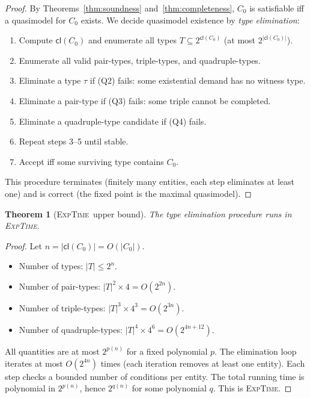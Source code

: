 \documentclass[a4paper,11pt]{article}
\newtheorem{theorem}{Theorem}[section]
\theoremstyle{definition}
\newcommand{\cl}{\ensuremath{\mathsf{cl}}}
\newcommand{\EXPTIME}{\textsc{ExpTime}}
\begin{document}
\begin{proof}
By Theorems~\ref{thm:soundness} and~\ref{thm:completeness},
$C_0$ is satisfiable iff a quasimodel for $C_0$ exists.
We decide quasimodel existence by \emph{type elimination}:

\begin{enumerate}[nosep]
  \item Compute $\cl(C_0)$ and enumerate all types
    $T \subseteq 2^{\cl(C_0)}$ (at most $2^{|\cl(C_0)|}$).
  \item Enumerate all valid pair-types, triple-types, and
    quadruple-types.
  \item Eliminate a type $\tau$ if (Q2) fails: some existential
    demand has no witness type.
  \item Eliminate a pair-type if (Q3) fails: some triple cannot
    be completed.
  \item Eliminate a quadruple-type candidate if (Q4) fails.
  \item Repeat steps 3--5 until stable.
  \item Accept iff some surviving type contains $C_0$.
\end{enumerate}

This procedure terminates (finitely many entities, each
step eliminates at least one) and is correct (the fixed point
is the maximal quasimodel).
\end{proof}


\begin{theorem}[\EXPTIME\ upper bound]
\label{thm:exptime}
The type elimination procedure runs in \EXPTIME.
\end{theorem}

\begin{proof}
Let $n = |\cl(C_0)| = O(|C_0|)$.

\begin{itemize}[nosep]
  \item Number of types: $|T| \leq 2^n$.
  \item Number of pair-types: $|T|^2 \times 4 = O(2^{2n})$.
  \item Number of triple-types:
    $|T|^3 \times 4^3 = O(2^{3n})$.
  \item Number of quadruple-types:
    $|T|^4 \times 4^6 = O(2^{4n+12})$.
\end{itemize}

All quantities are at most $2^{p(n)}$ for a fixed polynomial $p$.
The elimination loop iterates at most $O(2^{4n})$ times (each
iteration removes at least one entity).  Each step checks a
bounded number of conditions per entity.  The total running time
is polynomial in $2^{p(n)}$, hence $2^{q(n)}$ for some
polynomial $q$.  This is \EXPTIME.
\end{proof}
\end{document}
